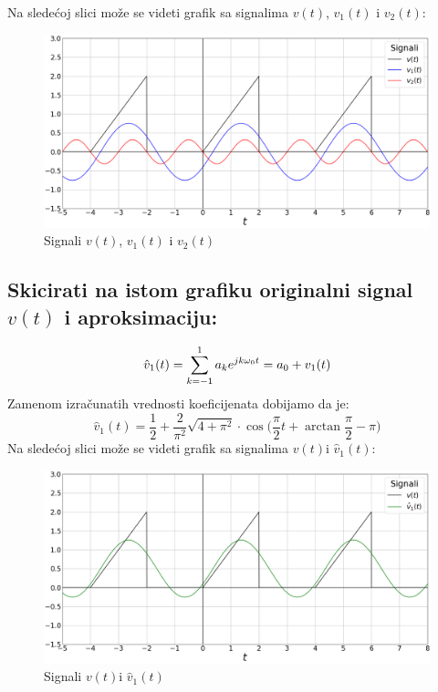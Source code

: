 \documentclass[titlepage,a4paper,12pt]{article}
\begin{document}
	\noindent Na sledećoj slici može se videti grafik sa signalima $v(t)$, $v_1(t)$ i $v_2(t)$:
	\begin{figure}[ht]
		\centering
		\includegraphics[width=\textwidth]{Images/zadatak4pic2.png}
		\caption{Signali $v(t)$, $v_1(t)$ i $v_2(t)$}\label{fig:slika9}
	\end{figure}
	\FloatBarrier
	\pagebreak
	
	
	\pagebreak
	\subsection[Treći deo]{Skicirati na istom grafiku originalni signal $v(t)$ i aproksimaciju:}
	\vspace{-15pt}
	\large{\begin{equation}
		\hat{v}_1(t) = \sum_{k=-1}^{1} a_k e^{jk\omega_0t}= a_0 + v_1(t)\notag
	\end{equation}}
	\normalsize{}
	Zamenom izračunatih vrednosti koeficijenata dobijamo da je:
	\begin{equation}
		\hat{v}_1(t) = \frac{1}{2} + \frac{2}{\pi^2}\sqrt{4+\pi^2}\cdot\cos\Big(\frac{\pi}{2}t+\arctan\frac{\pi}{2} - \pi\Big)
	\end{equation}
	\noindent Na sledećoj slici može se videti grafik sa signalima $v(t)$i $\hat{v}_1(t)$:
	\begin{figure}[ht]
		\centering
		\includegraphics[width=\textwidth]{Images/zadatak4pic3.png}
		\caption{Signali $v(t)$i $\hat{v}_1(t)$}\label{fig:slika10}
	\end{figure}
	\FloatBarrier
	\pagebreak
	
	
\end{document}
